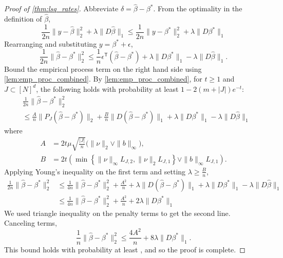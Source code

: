 \documentclass[ejs,noshowframe]{imsart}
\theoremstyle{plain}
\theoremstyle{definition}
\renewcommand{\hat}{\widehat}
\renewcommand{\top}{\mathsf{T}}
\begin{document}
\begin{appendix}
\begin{proof}[Proof of \autoref{thm:lsq_rates}]
	Abbreviate $\hat\delta =\hat\beta-\beta^*$.
	From the optimality in the definition of $\hat\beta$, 
	\begin{equation*}
		\frac{1}{2n}\| y - \hat\beta \|_2^2 + \lambda \| D\hat\beta\|_1 
		\leq 
		\frac{1}{2n}\| y - \beta^* \|_2^2 + \lambda \| D\beta^*\|_1 
	\end{equation*}
	Rearranging and substituting $y = \beta^* + \epsilon$,
	\begin{equation*}
		\frac{1}{2n}\|  \hat\beta - \beta^* \|_2^2 
		\leq 
		\frac{1}{n}\epsilon^\top (\hat \beta-\beta^*) + 
		\lambda \| D\beta^*\|_1 - \lambda \| D\hat\beta\|_1.
	\end{equation*}
	Bound the empirical process term on the right hand side using 
	\autoref{lem:emp_proc_combined}. By \autoref{lem:emp_proc_combined}, for 
	$t\geq 
	1$ and $J \subset [N]^d$, 
	the following holds with probability at least $1-2(m+|J|) e^{-t}:$ 
	\begin{align}
		& \frac{1}{2n}\|  \hat\beta - \beta^* \|_2^2 \\
		& \leq 
		\frac{A}{n}  \| P_{J} (\hat\beta-\beta^* )\|_2 + \frac{B}{n}  \| D 
		(\hat\beta-\beta^*) \|_1
		+
		\lambda \| D\beta^*\|_1 - \lambda \| D\hat\beta\|_1
	\end{align}
	where 
	\begin{align}
	A &= 2t\mu \sqrt{\frac{|J|}{n}} \big( \| \nu \|_2 \vee \|b\|_\infty\big),\\
	B &= 2t\left( 
	\min\left\{ \|\nu\|_\infty  L_{J,2}, 
	\|\nu\|_2 L_{J,1} \right\}
	\vee  \| b \|_\infty L_{J,1}\right).
	\end{align}
	Applying Young's inequality on the first term and setting $\lambda \geq 
	\frac{B}{n}$,
	\begin{align}
		\frac{1}{2n}\|  \hat\beta - \beta^* \|_2^2 
		&\leq 
		\frac{1}{4n} \| \hat\beta-\beta^* \|_2^2 + \frac{A^2}{n} +
		\lambda \| D (\hat\beta-\beta^*) \|_1
		+
		\lambda \| D\beta^*\|_1 - \lambda \| D\hat\beta\|_1\\
		&\leq \frac{1}{4n} \| \hat\beta-\beta^* \|_2^2 + \frac{A^2}{n} +
		2\lambda \| D \beta^*\|_1
	\end{align}
	We used triangle inequality on the penalty terms to get the second line. 
	Canceling terms,
	\begin{equation}
		\frac{1}{n}\|  \hat\beta - \beta^* \|_2^2 
		\leq \frac{4A^2}{n} +
		8\lambda \| D \beta^*\|_1.
	\end{equation}
	This bound holds with probability at least 
	, and so the proof is complete.
\end{proof}


\end{appendix}
\end{document}
